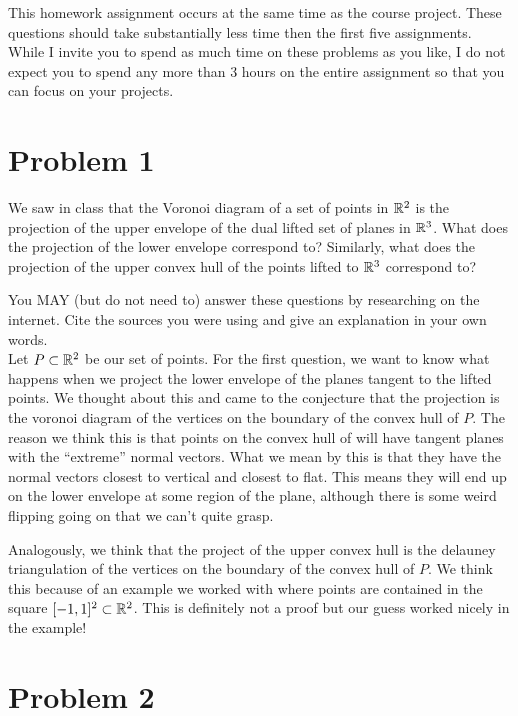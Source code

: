 \documentclass[11pt]{article}
\begin{document}


\vspace{1em}

This homework assignment occurs at the same time as the course project.  These
questions should take substantially less time then the first five assignments.
While I invite you to spend as much time on these problems as you like, I do not
expect you to spend any more than 3 hours on the entire assignment so that you
can focus on your projects.


\newpage
\section*{Problem 1}

We saw in class that the Voronoi diagram of a set of points in $\mathbb{R}^2$ is the
projection of the upper envelope of the dual lifted set of planes in $\mathbb{R}^3$.
What does the projection of the lower envelope correspond to? Similarly, what
does the projection of the upper convex hull of the points lifted to $\mathbb{R}^3$
correspond to?

You MAY (but do not need to) answer these questions by researching on the
internet. Cite the sources you were using and give an explanation in your own
words. \\

\answer
Let $P \subset \mathbb{R} ^2$ be our set of points.
For the first question, we want to know what happens when we project the lower envelope of the planes tangent to the lifted points.
We thought about this and came to the conjecture that the projection is the voronoi diagram of the vertices on the boundary of the convex hull of $P$.
The reason we think this is that points on the convex hull of will have tangent planes with the ``extreme'' normal vectors.
What we mean by this is that they have the normal vectors closest to vertical and closest to flat.
This means they will end up on the lower envelope at some region of the plane, although there is some weird flipping going on that we can't quite grasp.

Analogously, we think that the project of the upper convex hull is the delauney triangulation of the vertices on the boundary of the convex hull of $P$.
We think this because of an example we worked with where points are contained in the square $[-1,1]^2 \subset \mathbb{R} ^2$.
This is definitely not a proof but our guess worked nicely in the example!

\newpage
\section*{Problem 2}
\end{document}
